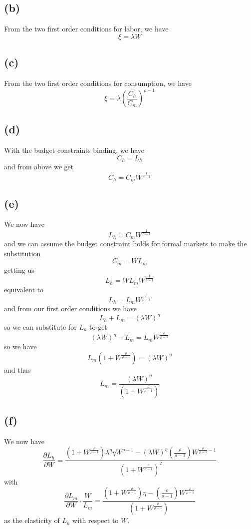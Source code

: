 \documentclass[11pt]{amsart}
\begin{document}
\subsection*{(b)}

From the two first order conditions for labor, we have 
\[
\xi = \lambda W
\]

\subsection*{(c)}

From the two first order conditions for consumption, we have
\[
\xi = \lambda \left( \frac{C_h}{C_m} \right)^{\rho-1}
\]

\subsection*{(d)}

With the budget constraints binding, we have
\[
C_h = L_h
\]
and from above we get
\[
C_h = C_m W^{\frac{1}{\rho-1}}
\]

\subsection*{(e)}

We now have
\[
L_h = C_m W^{\frac{1}{\rho-1}}
\]
and we can assume the budget constraint holds for formal markets to make the substitution
\[
C_m = WL_m
\]
getting us
\[
L_h = WL_m W^{\frac{1}{\rho-1}}
\]
equivalent to
\[
L_h = L_m W^{\frac{\rho}{\rho-1}}
\]
and from our first order conditions we have
\[
L_h + L_m = (\lambda W)^{\eta}
\]
so we can substitute for $L_h$ to get
\[
(\lambda W)^{\eta} - L_m = L_m W^{\frac{\rho}{\rho-1}}
\]
so we have
\[
L_m (1 + W^{\frac{\rho}{\rho-1}}) = (\lambda W)^{\eta}
\]
and thus
\[
L_m = \frac{(\lambda W)^{\eta}}{(1 + W^{\frac{\rho}{\rho-1}})}
\]

\subsection*{(f)}

We now have
\[
\frac{\partial L_h}{\partial W} = \frac{(1 + W^{\frac{\rho}{\rho-1}}) \lambda^{\eta} \eta W^{\eta - 1} - (\lambda W)^{\eta} (\frac{\rho}{\rho-1}) W^{\frac{\rho}{\rho-1} - 1}}{(1 + W^{\frac{\rho}{\rho-1}})^2}
\]
with 
\[
\frac{\partial L_m}{\partial W} \cdot \frac{W}{L_m} = \frac{(1 + W^{\frac{\rho}{\rho-1}}) \eta  -  (\frac{\rho}{\rho-1}) W^{\frac{\rho}{\rho-1}}}{(1 + W^{\frac{\rho}{\rho-1}})}
\]
as the elasticity of $L_h$ with respect to $W$.
\end{document}
